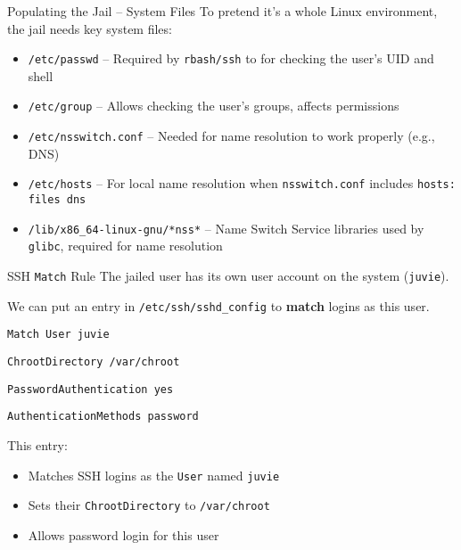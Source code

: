 \documentclass[14pt,compress,dvipsnames,aspectratio=169]{beamer} %
\begin{document}
\begin{frame}{Populating the Jail -- System Files}
    To pretend it's a whole Linux environment, the jail needs key system files:
    \begin{itemize}
        \item{\texttt{/etc/passwd} -- Required by \texttt{rbash/ssh} to for checking the user's UID and shell} 
        \item{\texttt{/etc/group} -- Allows checking the user's groups, affects permissions} 
        \item{\texttt{/etc/nsswitch.conf} -- Needed for name resolution to work
            properly (e.g., DNS)} 
        \item{\texttt{/etc/hosts} -- For local name resolution when \texttt{nsswitch.conf} includes \texttt{hosts: files dns}} 
        \item{\texttt{/lib/x86\_64-linux-gnu/*nss*} -- Name Switch Service libraries
            used by \texttt{glibc}, required for name resolution} 
    \end{itemize}
    \vspace{0.5em}
\end{frame}


\begin{frame}{SSH \texttt{Match} Rule}
    The jailed user has its own user account on the system (\texttt{juvie}).  

    \vspace{0.25cm}
    We can put an entry in \texttt{/etc/ssh/sshd\_config} to \textbf{match} logins
    as this user.  
    \vspace{0.25cm}

    \texttt{Match User juvie}

    \hspace{1.0cm}\texttt{ChrootDirectory /var/chroot}

    \hspace{1.0cm}\texttt{PasswordAuthentication yes}

    \hspace{1.0cm}\texttt{AuthenticationMethods password}

    \vspace{0.25cm}
    This entry:
    \begin{itemize}
        \item{Matches SSH logins as the \texttt{User} named \texttt{juvie}} 
        \item{Sets their \texttt{ChrootDirectory} to \texttt{/var/chroot}} 
        \item{Allows password login for this user} 
    \end{itemize}
\end{frame}
\end{document}
